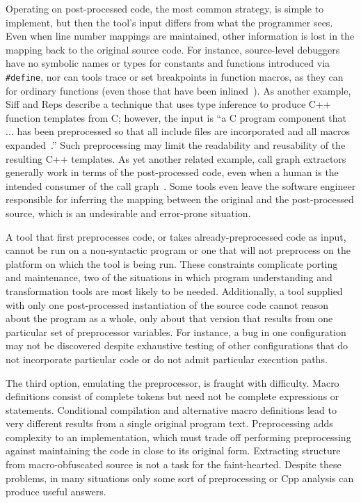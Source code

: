 \documentclass[10pt]{article}
\begin{document}
Operating on post-processed code, the most common strategy, is simple to
implement, but then the tool's input differs from what the
programmer sees.  Even when line number mappings are maintained, other
information is lost in the mapping back to the original source code.
For instance, source-level debuggers have no symbolic names or types
for constants and functions introduced via {\tt \#define}, nor can tools
trace or set breakpoints in function macros, as they can for ordinary
functions (even those that have been inlined~\cite{Zellweger83:TR}).
As another example, Siff
and Reps describe a technique that uses type inference to produce
C++ function templates from C; however, the input is ``a C program
component that $\ldots$ has been preprocessed so that all include
files are incorporated and all macros
expanded~\cite[p.~145]{Siff-fse96}.''  Such preprocessing may limit
the readability and reusability of the resulting C++ templates.  As
yet another related example, call graph extractors generally work in
terms of the post-processed code, even when a human is the intended
consumer of the call graph~\cite{Murphy-icse18}.  Some tools even
leave the software engineer responsible for inferring the mapping between the
original and the post-processed source, which is an undesirable and
error-prone situation.

A tool that first preprocesses code, or takes already-preprocessed code as
input, cannot be run on a non-syntactic program or one that will not
preprocess on the platform on which the tool is being run.  These
constraints complicate porting and maintenance, two of the situations in
which program understanding and transformation tools are most likely to be
needed.  Additionally, a tool supplied with only one post-processed
instantiation of the source code cannot reason about the program as a
whole, only about that version that results from one particular set of
preprocessor variables.  For instance, a bug in one configuration may not
be discovered despite exhaustive testing of other configurations that do
not incorporate particular code or do not admit particular execution paths.

The third option, emulating the preprocessor, is fraught with difficulty.
Macro definitions consist of complete tokens but need not be complete
expressions or statements.  Conditional compilation and alternative macro
definitions lead to very different results from a single original program
text.  Preprocessing adds complexity to an implementation, which must trade
off performing preprocessing against maintaining the code in close to its
original form.  Extracting structure from macro-obfuscated source is not a
task for the faint-hearted.  Despite these problems, in many situations
only some sort of preprocessing or Cpp analysis can produce useful answers.
\end{document}
